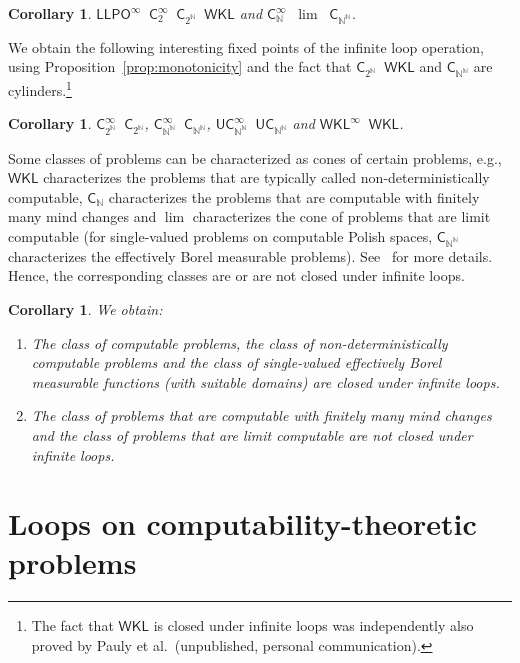 \documentclass[11pt,a4paper]{amsart}
\theoremstyle{plain}
\newtheorem{cor}[thm]{Corollary}
\theoremstyle{definition}
\theoremstyle{defC}
\theoremstyle{thmC}
\theoremstyle{plain}
\numberwithin{equation}{section}
\def\IN{{\mathbb{N}}}
\def\U{{\mathsf{{U}}}}
\def\C{{\mathsf{{C}}}}
\def\LLPO{\mathsf{LLPO}}
\def\WKL{\mathsf{WKL}}
\def\C{\mathsf{C}}
\def\equivSW{\mathop{\equiv_{\mathrm{sW}}}}
\def\lW{\mathop{<_{\mathrm{W}}}}
\def\equivSW{\mathop{\equiv_{\mathrm{sW}}}}
\def\lW{\mathop{<_{\mathrm{W}}}}
\begin{document}
\begin{cor}
$\LLPO^\infty\equivSW\C_2^\infty\equivSW\C_{2^\IN}\equivSW\WKL$ and $\C_\IN^\infty\equivSW\lim\lW\C_{\IN^\IN}$.
\end{cor}

\noindent
We obtain the following interesting fixed points of the infinite loop operation, 
using Proposition~\ref{prop:monotonicity} and the fact
that $\C_{2^\IN}\equivSW\WKL$ and $\C_{\IN^\IN}$ are cylinders.\footnote{The fact that $\WKL$ 
is closed under infinite loops was independently also proved by Pauly et al.\ (unpublished, personal communication).}

\begin{cor}
$\C_{2^\IN}^\infty\equivSW\C_{2^\IN}$, $\C_{\IN^\IN}^\infty\equivSW\C_{\IN^\IN}$, $\U\C_{\IN^\IN}^\infty\equivSW\U\C_{\IN^\IN}$ and $\WKL^\infty\equivSW\WKL$.
\end{cor}

\noindent
Some classes of problems can be characterized as cones of certain problems, e.g., $\WKL$ characterizes
the problems that are typically called non-deterministically computable, $\C_\IN$ characterizes the problems
that are computable with finitely many mind changes and $\lim$ characterizes the cone of problems
that are limit computable (for single-valued problems on computable Polish spaces, $\C_{\IN^\IN}$ characterizes
the effectively Borel measurable problems). See~\cite{BBP12} for more details.
Hence, the corresponding classes are or are not closed under infinite loops.

\begin{cor}
We obtain:
\begin{enumerate} 
\item The class of computable problems, the class of non-deterministically computable problems
and the class of single-valued effectively Borel measurable functions (with suitable domains) are closed
under infinite loops.
\item The class of problems that are computable with finitely many mind changes and the class
of problems that are limit computable are not closed under infinite loops.
\end{enumerate}
\end{cor}


\section{Loops on computability-theoretic problems}
\label{sec:NON}
\end{document}
